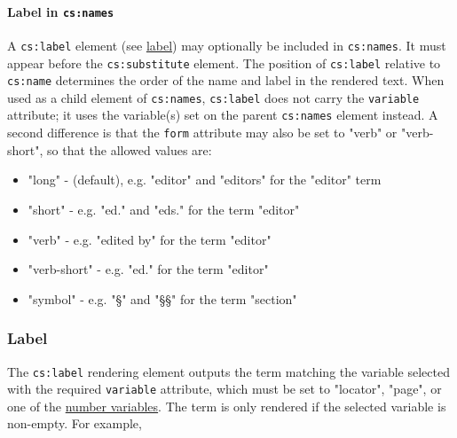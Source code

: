 \hypertarget{label-in-csnames}{%
\paragraph{\texorpdfstring{Label in
\texttt{cs:names}}{Label in cs:names}}\label{label-in-csnames}}

A \texttt{cs:label} element (see \protect\hyperlink{label}{label}) may
optionally be included in \texttt{cs:names}. It must appear before the
\texttt{cs:substitute} element. The position of \texttt{cs:label}
relative to \texttt{cs:name} determines the order of the name and label
in the rendered text. When used as a child element of \texttt{cs:names},
\texttt{cs:label} does not carry the \texttt{variable} attribute; it
uses the variable(s) set on the parent \texttt{cs:names} element
instead. A second difference is that the \texttt{form} attribute may
also be set to "verb" or "verb-short", so that the allowed values are:

\begin{itemize}
\tightlist
\item
  "long" - (default), e.g. "editor" and "editors" for the "editor" term
\item
  "short" - e.g. "ed." and "eds." for the term "editor"
\item
  "verb" - e.g. "edited by" for the term "editor"
\item
  "verb-short" - e.g. "ed." for the term "editor"
\item
  "symbol" - e.g. "§" and "§§" for the term "section"
\end{itemize}

\hypertarget{label}{%
\subsubsection{Label}\label{label}}

The \texttt{cs:label} rendering element outputs the term matching the
variable selected with the required \texttt{variable} attribute, which
must be set to "locator", "page", or one of the
\protect\hyperlink{number-variables}{number variables}. The term is only
rendered if the selected variable is non-empty. For example,

\begin{Shaded}
\begin{Highlighting}[]
\NormalTok{\textless{}}\NormalTok{\textgreater{}}
\NormalTok{  \textless{}}\NormalTok{/\textgreater{}}
\NormalTok{  \textless{}}\NormalTok{/\textgreater{}}
\NormalTok{\textless{}/}\NormalTok{\textgreater{}}
\end{Highlighting}
\end{Shaded}

